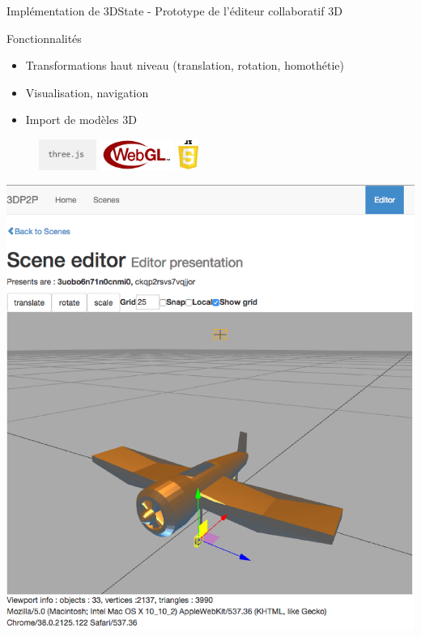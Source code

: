 \begin{frame}{Implémentation de 3DState - Prototype de l'éditeur collaboratif 3D}


	\begin{minipage}{.45\columnwidth}
		Fonctionnalités
		\begin{itemize}
			\item Transformations haut niveau (translation, rotation, homothétie)
			\item Visualisation, navigation
			\item Import de modèles 3D
		\end{itemize}
	
	
	\begin{figure}[h]
		\centering
		\includegraphics[height=1cm]{img/threejs.jpg}
		\includegraphics[height=1cm]{img/webgl.png}
		\includegraphics[height=1cm]{img/js.png}
		\label{fig:client}
	\end{figure}
	\end{minipage}\hfill
	\begin{minipage}{.55\columnwidth}
		\centering
		\includegraphics[width=0.8\columnwidth]{eps/editorpresentation.eps}
	\end{minipage}

\end{frame}

